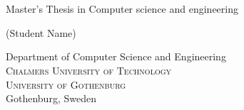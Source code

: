 
\begin{titlepage}
			
\addtolength{\voffset}{2cm}

\begin{figure}[H]
\centering
\vspace{1cm}	%
\end{figure}

\mbox{}
\vfill
\renewcommand{\familydefault}{\sfdefault} \normalfont %

\textbf{\Huge \multiLineTitle{0.2cm}} 
\\[0.5cm]

{\Large \oneLineSubtitle{0.2cm}}\\[0.5cm]


Master's Thesis in Computer science and engineering \setlength{\parskip}{1cm}

{\Large (Student Name)} \setlength{\parskip}{2.9cm}

Department of Computer Science and Engineering \\
\textsc{Chalmers University of Technology} \\
\textsc{University of Gothenburg} \\
Gothenburg, Sweden \the\year

\renewcommand{\familydefault}{\rmdefault} \normalfont %
\end{titlepage}


\newpage
\restoregeometry
\thispagestyle{empty}
\mbox{}


